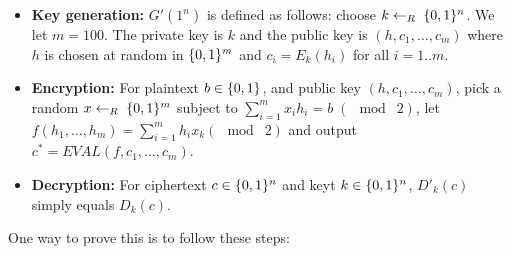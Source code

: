 \documentclass{article}
\begin{document}
\begin{itemize}%

\item{}
\textbf{Key generation:}  $G'(1^n)$ is defined as follows: choose $k\leftarrow_R\;\{0,1\}^n$. We let $m=100$.  The private key is $k$ and the public key is $(h,c_1,\ldots,c_m)$ where $h$ is chosen at random in $\{0,1\}^m$ and $c_i=E_k(h_i)$ for all $i=1..m$.%

\item{}
\textbf{Encryption:} For plaintext $b\in\{0,1\}$, and public key $(h,c_1,\ldots,c_m)$, pick a random $x\leftarrow_R\;\{0,1\}^m$ subject to $\sum_{i=1}^m x_i h_i = b \;(\mod\; 2)$, let $f(h_1,\ldots,h_m)=\sum_{i=1}^m h_ix_k (\mod\; 2)$ and output $c^* = EVAL(f,c_1,\ldots,c_m)$.%

\item{}
\textbf{Decryption:} For ciphertext $c\in\{0,1\}^n$ and keyt $k\in\{0,1\}^n$, $D'_k(c)$ simply equals $D_k(c)$.%
\end{itemize}%

\noindent{}One way to prove this is to follow these steps:%
\end{document}

